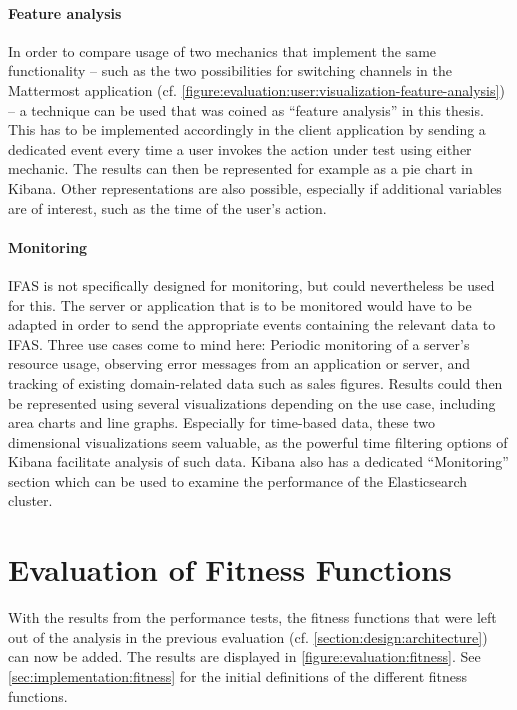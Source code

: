 \paragraph{Feature analysis}
In order to compare usage of two mechanics that implement the same functionality -- such as the two possibilities for switching channels in the Mattermost application (cf. \cref{figure:evaluation:user:visualization-feature-analysis}) -- a technique can be used that was coined as ``feature analysis'' in this thesis.
This has to be implemented accordingly in the client application by sending a dedicated event every time a user invokes the action under test using either mechanic.
The results can then be represented for example as a pie chart in Kibana.
Other representations are also possible, especially if additional variables are of interest, such as the time of the user's action.

\paragraph{Monitoring}
\ac{IFAS} is not specifically designed for monitoring, but could nevertheless be used for this.
The server or application that is to be monitored would have to be adapted in order to send the appropriate events containing the relevant data to \ac{IFAS}.
Three use cases come to mind here: Periodic monitoring of a server's resource usage, observing error messages from an application or server, and tracking of existing domain-related data such as sales figures.
Results could then be represented using several visualizations depending on the use case, including area charts and line graphs.
Especially for time-based data, these two dimensional visualizations seem valuable, as the powerful time filtering options of Kibana facilitate analysis of such data.
Kibana also has a dedicated ``Monitoring'' section which can be used to examine the performance of the Elasticsearch cluster.

\section{Evaluation of Fitness Functions}
\label{sec:evaluation:fitness}

With the results from the performance tests, the fitness functions that were left out of the analysis in the previous evaluation (cf. \cref{section:design:architecture}) can now be added.
The results are displayed in \cref{figure:evaluation:fitness}.
See \cref{sec:implementation:fitness} for the initial definitions of the different fitness functions.

